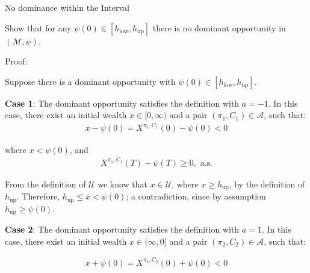 \documentclass{beamer}
\begin{document}
\begin{frame}{No dominance within the Interval}

    {\footnotesize \footnotesize
    \par Show that for any $\psi(0) \in [h_{\text{low}}, h_{\text{up}}]$ there is no dominant opportunity in $(\mathcal{M}, \psi)$.
    \par Proof:
    \par Suppose there is a dominant opportunity with $\psi(0) \in [h_{\text{low}}, h_{\text{up}}]$.
    \par \textbf{Case 1}: The dominant opportunity satisfies the definition with $a = -1$. In this case, there exist 
    an initial wealth $x \in [0, \infty)$ and a pair $(\pi_1, C_1) \in \mathcal{A}$, such that:
    \begin{align*}
        x - \psi(0) = X^{\pi_1, C_1}(0) - \psi(0) < 0
    \end{align*}
    \par where $x < \psi(0)$, and
    \begin{align*}
        X^{\pi_1, C_1}(T) - \psi(T) \geq 0, \text{ a.s.}
    \end{align*}
    \par From the definition of $\mathcal{U}$ we know that $x \in \mathcal{U}$, 
    where $x \geq h_{\text{up}}$, by the definition of $h_{\text{up}}$. 
    Therefore, $h_{\text{up}} \leq x < \psi(0)$; a contradiction, since by assumption $h_{\text{up}} \geq \psi(0)$.
    \vspace{1em}
     \par \textbf{Case 2}: The dominant opportunity satisfies the definition with $a = 1$. In this case, there exist 
    an initial wealth $x \in (\infty,0]$ and a pair $(\pi_2, C_2) \in \mathcal{A}$, such that:

    \begin{align*}
        x + \psi(0) = X^{\pi_2, C_2}(0) + \psi(0) < 0
    \end{align*}
    }

\end{frame} 
\end{document}

